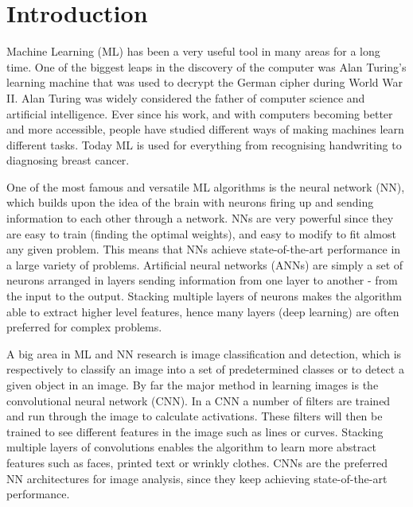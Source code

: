 \section{Introduction} \label{tex:introduction}

Machine Learning (ML) has been a very useful tool in many areas for a long time. One of the biggest leaps in the discovery of the computer was Alan Turing's learning machine that was used to decrypt the German cipher during World War II\cite{turing}. Alan Turing was widely considered the father of computer science and artificial intelligence\cite{Beavers2013}. Ever since his work, and with computers becoming better and more accessible, people have studied different ways of making machines learn different tasks. Today ML is used for everything from recognising handwriting to diagnosing breast cancer\cite{Khuriwal2018}. 

One of the most famous and versatile ML algorithms is the neural network (NN), which builds upon the idea of the brain with neurons firing up and sending information to each other through a network. NNs are very powerful since they are easy to train (finding the optimal weights), and easy to modify to fit almost any given problem. This means that NNs achieve state-of-the-art performance in a large variety of problems. Artificial neural networks (ANNs) are simply a set of neurons arranged in layers sending information from one layer to another - from the input to the output. Stacking multiple layers of neurons makes the algorithm able to extract higher level features\cite{deepLearning}, hence many layers (deep learning) are often preferred for complex problems.

A big area in ML and NN research is image classification and detection, which is respectively to classify an image into a set of predetermined classes or to detect a given object in an image. By far the major method in learning images is the convolutional neural network (CNN). In a CNN a number of filters are trained and run through the image to calculate activations. These filters will then be trained to see different features in the image such as lines or curves. Stacking multiple layers of convolutions enables the algorithm to learn more abstract features such as faces, printed text or wrinkly clothes\cite{Yosinski2015}. CNNs are the preferred NN architectures for image analysis, since they keep achieving state-of-the-art performance.

